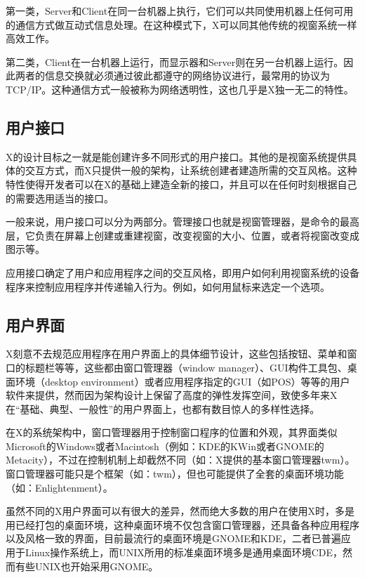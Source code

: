 \documentclass[doctor,openright,twoside]{sjtuthesis}
\theoremstyle{plain}
\theoremstyle{definition}
\theoremstyle{remark}
\theoremstyle{ocrenumbox}
\theoremstyle{plain}
\newcommand\cqh{“}
\newcommand\cqt{”}
\begin{document}
第一类，Server和Client在同一台机器上执行，它们可以共同使用机器上任何可用的通信方式做互动式信息处理。在这种模式下，X可以同其他传统的视窗系统一样高效工作。

第二类，Client在一台机器上运行，而显示器和Server则在另一台机器上运行。因此两者的信息交换就必须通过彼此都遵守的网络协议进行，最常用的协议为TCP/IP。这种通信方式一般被称为网络透明性，这也几乎是X独一无二的特性。

\subsection{用户接口}

X的设计目标之一就是能创建许多不同形式的用户接口。其他的是视窗系统提供具体的交互方式，而X只提供一般的架构，让系统创建者建造所需的交互风格。这种特性使得开发者可以在X的基础上建造全新的接口，并且可以在任何时刻根据自己的需要选用适当的接口。

一般来说，用户接口可以分为两部分。管理接口也就是视窗管理器，是命令的最高层，它负责在屏幕上创建或重建视窗，改变视窗的大小、位置，或者将视窗改变成图示等。

应用接口确定了用户和应用程序之间的交互风格，即用户如何利用视窗系统的设备程序来控制应用程序并传递输入行为。例如，如何用鼠标来选定一个选项。

\subsection{用户界面}

X刻意不去规范应用程序在用户界面上的具体细节设计，这些包括按钮、菜单和窗口的标题栏等等，这些都由窗口管理器（window
manager）、GUI构件工具包、桌面环境（desktop
environment）或者应用程序指定的GUI（如POS）等等的用户软件来提供，然而因为架构设计上保留了高度的弹性发挥空间，致使多年来X在\cqh 基础、典型、一般性\cqt 的用户界面上，也都有数目惊人的多样性选择。

在X的系统架构中，窗口管理器用于控制窗口程序的位置和外观，其界面类似Microsoft的Windows或者Macintosh（例如：KDE的KWin或者GNOME的Metacity），不过在控制机制上却截然不同（如：X提供的基本窗口管理器twm）。窗口管理器可能只是个框架（如：twm），但也可能提供了全套的桌面环境功能（如：Enlightenment）。

虽然不同的X用户界面可以有很大的差异，然而绝大多数的用户在使用X时，多是用已经打包的桌面环境，这种桌面环境不仅包含窗口管理器，还具备各种应用程序以及风格一致的界面，目前最流行的桌面环境是GNOME和KDE，二者已普遍应用于Linux操作系统上，而UNIX所用的标准桌面环境多是通用桌面环境CDE，然而有些UNIX也开始采用GNOME。
\end{document}
